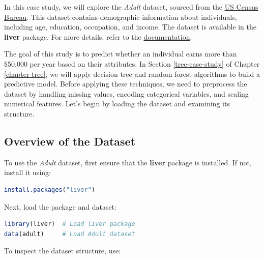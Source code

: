 \documentclass[
  11pt,
]{book}
\theoremstyle{definition}
\theoremstyle{definition}
\theoremstyle{definition}
\theoremstyle{definition}
\theoremstyle{remark}
\begin{document}
In this case study, we will explore the \emph{Adult} dataset, sourced from the \href{https://www.census.gov}{US Census Bureau}. This dataset contains demographic information about individuals, including age, education, occupation, and income. The dataset is available in the \textbf{liver} package. For more details, refer to the \href{https://www.rdocumentation.org/packages/liver/versions/1.3/topics/adult}{documentation}.

The goal of this study is to predict whether an individual earns more than \$50,000 per year based on their attributes. In Section \ref{tree-case-study} of Chapter \ref{chapter-tree}, we will apply decision tree and random forest algorithms to build a predictive model. Before applying these techniques, we need to preprocess the dataset by handling missing values, encoding categorical variables, and scaling numerical features. Let's begin by loading the dataset and examining its structure.

\subsection*{Overview of the Dataset}\label{overview-of-the-dataset}


To use the \emph{Adult} dataset, first ensure that the \textbf{liver} package is installed. If not, install it using:

\begin{lstlisting}[language=R]
install.packages("liver")
\end{lstlisting}

Next, load the package and dataset:

\begin{lstlisting}[language=R]
library(liver)  # Load liver package
data(adult)     # Load Adult dataset
\end{lstlisting}

To inspect the dataset structure, use:
\end{document}
